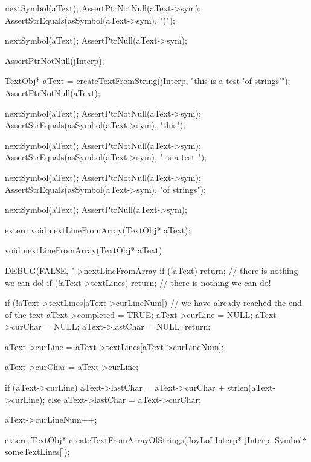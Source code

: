   nextSymbol(aText);
  AssertPtrNotNull(aText->sym);
  AssertStrEquals(asSymbol(aText->sym), ")");

  nextSymbol(aText);
  AssertPtrNull(aText->sym);
\stopCTest
\stopTestCase

\startCTest
  AssertPtrNotNull(jInterp);

  TextObj* aText =
    createTextFromString(jInterp, "this \" is a test \" 'of strings'");
  AssertPtrNotNull(aText);
  
  nextSymbol(aText);
  AssertPtrNotNull(aText->sym);
  AssertStrEquals(asSymbol(aText->sym), "this");

  nextSymbol(aText);
  AssertPtrNotNull(aText->sym);
  AssertStrEquals(asSymbol(aText->sym), " is a test ");

  nextSymbol(aText);
  AssertPtrNotNull(aText->sym);
  AssertStrEquals(asSymbol(aText->sym), "of strings");

  nextSymbol(aText);
  AssertPtrNull(aText->sym);
\stopCTest
\stopTestCase
\stopTestSuite


\startCHeader
extern void nextLineFromArray(TextObj* aText);
\stopCHeader
{}

\startCCode
void nextLineFromArray(TextObj* aText) {
  DEBUG(FALSE, "->nextLineFromArray %
  if (!aText) return;  // there is nothing we can do!
  if (!aText->textLines) return; // there is nothing we can do!

  if (!aText->textLines[aText->curLineNum]) {
    // we have already reached the end of the text
    aText->completed  = TRUE;
    aText->curLine    = NULL;
    aText->curChar    = NULL;
    aText->lastChar   = NULL;
    return;
  }

  aText->curLine  = aText->textLines[aText->curLineNum];

  aText->curChar  = aText->curLine;

  if (aText->curLine) {
    aText->lastChar = aText->curChar + strlen(aText->curLine);
  } else aText->lastChar = aText->curChar;

  aText->curLineNum++;
}
\stopCCode

\startCHeader
extern TextObj* createTextFromArrayOfStrings(JoyLoLInterp* jInterp,
                                             Symbol* someTextLines[]);
\stopCHeader

